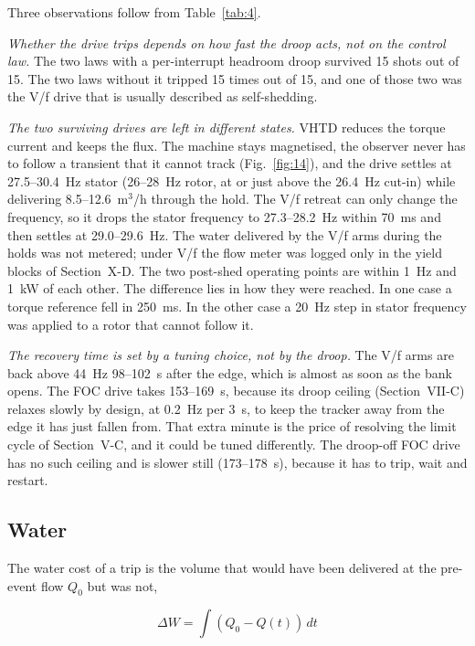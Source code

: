 \documentclass[journal]{IEEEtran}
\begin{document}
Three observations follow from Table~\ref{tab:4}.

\emph{Whether the drive trips depends on how fast the droop acts, not on the control law.} The two laws with a per-interrupt headroom droop survived 15 shots out of 15. The two laws without it tripped 15 times out of 15, and one of those two was the V/f drive that is usually described as self-shedding.

\emph{The two surviving drives are left in different states.} VHTD reduces the torque current and keeps the flux. The machine stays magnetised, the observer never has to follow a transient that it cannot track (Fig.~\ref{fig:14}), and the drive settles at 27.5--30.4~Hz stator (26--28~Hz rotor, at or just above the 26.4~Hz cut-in) while delivering 8.5--12.6~m$^{3}$/h through the hold. The V/f retreat can only change the frequency, so it drops the stator frequency to 27.3--28.2~Hz within 70~ms and then settles at 29.0--29.6~Hz. The water delivered by the V/f arms during the holds was not metered; under V/f the flow meter was logged only in the yield blocks of Section~X-D. The two post-shed operating points are within 1~Hz and 1~kW of each other. The difference lies in how they were reached. In one case a torque reference fell in 250~ms. In the other case a 20~Hz step in stator frequency was applied to a rotor that cannot follow it.

\emph{The recovery time is set by a tuning choice, not by the droop.} The V/f arms are back above 44~Hz 98--102~s after the edge, which is almost as soon as the bank opens. The FOC drive takes 153--169~s, because its droop ceiling (Section~VII-C) relaxes slowly by design, at 0.2~Hz per 3~s, to keep the tracker away from the edge it has just fallen from. That extra minute is the price of resolving the limit cycle of Section~V-C, and it could be tuned differently. The droop-off FOC drive has no such ceiling and is slower still (173--178~s), because it has to trip, wait and restart.

\subsection{Water}

The water cost of a trip is the volume that would have been delivered at the pre-event flow $Q_0$ but was not,

\begin{equation}
\Delta W = \int \left(Q_0 - Q(t)\right)\,dt
\label{eq:22}
\end{equation}
\end{document}
